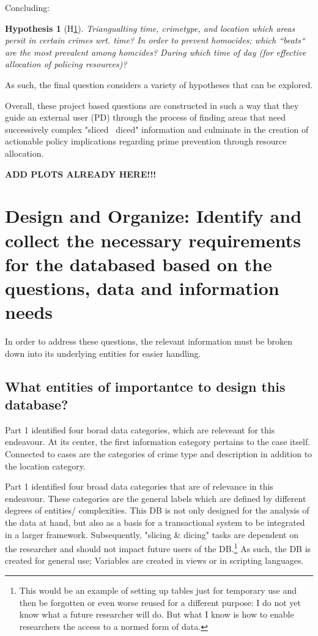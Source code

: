 \documentclass[a4paper]{article}
\newtheorem{hyp}{Hypothesis}
\begin{document}
Concluding: 
\begin{hyp}[H\ref{hyp:third}] \label{hyp:third}
Triangualting time, crimetype, and location which areas persit in certain crimes wrt. time?
In order to prevent homocides; which “beats“ are the most prevalent among homcides? During which time of day (for effective allocation of policing resources)? 

\end{hyp}

As such, the final question considers a variety of hypotheses that can be explored. 


Overall, these project based questions are constructed in such a way that they guide an external user (PD) through the process of finding areas that need successively complex "sliced \ diced" information and culminate in the creation of actionable policy implications regarding prime prevention through resource allocation.


\textbf{ADD PLOTS ALREADY HERE!!!}

\section{Design and Organize: Identify and collect the necessary requirements for the databased based on the questions, data and information needs}
In order to address these questions, the relevant information must be broken down into its underlying entities for easier handling. 

\subsection{What entities of importantce to design this database?}
Part 1 identified four borad data categories, which are releveant for this endeavour. At its center, the first information category pertains to the case itself. Connected to cases are the categories of crime type and description in addition to the location category. 
 
 
 
 


Part 1 identified four broad data categories that are of relevance in this endeavour. These categories are the general labels which are defined by different degrees of entities/ complexities. This DB is not only designed for the analysis of the data at hand, but also as a basis for a transactional system to be integrated in a larger framework. Subsequently, "slicing \& dicing" tasks are dependent on the researcher and should not impact future users of the DB.\footnote{This would be an example of setting up tables just for temporary use and then be forgotten or even worse reused for a different purpose: I do not yet know what a future researcher will do. But what I know is how to enable researchers the access to a normed form of data.} As such, the DB is created for general use; Variables are created in views or in scripting languages. 
\end{document}
